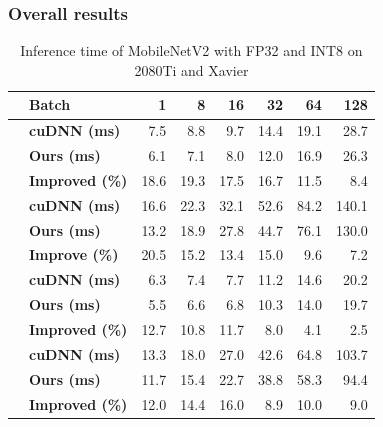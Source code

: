 \subsubsection{Overall results}
\begin{table}[]
\setlength{\tabcolsep}{4.4pt}
    \caption{Inference time of MobileNetV2 with FP32 and INT8 on 2080Ti and Xavier}
    \vspace{-3mm}
    \label{tab:infertime}
    \centering
    \begin{threeparttable}
    \begin{tabular}{c|l|rrrrrr}
    \toprule
    &\textbf{Batch} & 1 & 8 & 16& 32 &64 & 128\\
    \midrule
    &\textbf{cuDNN (ms)}   &7.5  &8.8  &9.7  &14.4 &19.1 &28.7 \\
    &\textbf{Ours (ms)}    &6.1  &7.1  &8.0  &12.0 &16.9 &26.3\\
    &\textbf{Improved (\%)} &18.6 &19.3 &17.5 &16.7 &11.5 &8.4 \\
    \hline
    &\textbf{cuDNN (ms)}   &16.6 &22.3 &32.1 &52.6 &84.2 &140.1  \\
    &\textbf{Ours (ms)}    &13.2 &18.9 &27.8 &44.7 &76.1 &130.0 \\
    &\textbf{Improve (\%)} &20.5 &15.2 &13.4 &15.0 &9.6  &7.2 \\
    \hline
    &\textbf{cuDNN (ms)}   &6.3  &7.4  &7.7  &11.2 &14.6 &20.2 \\
    &\textbf{Ours (ms)}    &5.5  &6.6  &6.8  &10.3 &14.0 &19.7\\
    &\textbf{Improved (\%)} &12.7 &10.8 &11.7 &8.0  &4.1  &2.5 \\
    \hline
    &\textbf{cuDNN (ms)}   &13.3 &18.0 &27.0 &42.6 &64.8 &103.7  \\
    &\textbf{Ours (ms)}    &11.7 &15.4 &22.7 &38.8 &58.3 &94.4 \\
    &\textbf{Improved (\%)} &12.0 &14.4 &16.0 &8.9 &10.0  &9.0 \\


    \bottomrule
    \end{tabular}
    \footnotesize
    \end{threeparttable}

\end{table}

